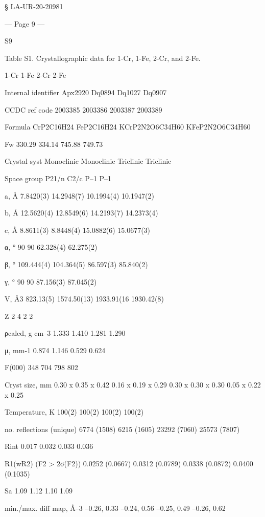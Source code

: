  
 
§ LA-UR-20-20981 


--- Page 9 ---
 
 
S9 
 
 
Table S1. Crystallographic data for 1-Cr, 1-Fe, 2-Cr, and 2-Fe. 
 
1-Cr 
1-Fe 
2-Cr 
2-Fe 
 
Internal identifier 
Apx2920 
Dq0894 
Dq1027 
Dq0907 
 
CCDC ref code 
2003385 
2003386 
2003387 
2003389 
 
Formula 
CrP2C16H24 
FeP2C16H24 
KCrP2N2O6C34H60 
KFeP2N2O6C34H60 
 
Fw 
330.29 
334.14 
745.88 
749.73 
 
Crystal syst 
Monoclinic 
Monoclinic 
Triclinic 
Triclinic 
 
Space group 
P21/n 
C2/c 
P–1 
P–1 
 
a, Å 
7.8420(3) 
14.2948(7) 
10.1994(4) 
10.1947(2) 
 
b, Å 
12.5620(4) 
12.8549(6) 
14.2193(7) 
14.2373(4) 
 
c, Å 
8.8611(3) 
8.8448(4) 
15.0882(6) 
15.0677(3) 
 
α, ° 
90 
90 
62.328(4) 
62.275(2) 
 
β, ° 
109.444(4) 
104.364(5) 
86.597(3) 
85.840(2) 
 
γ, ° 
90 
90 
87.156(3) 
87.045(2) 
 
V, Å3 
823.13(5) 
1574.50(13) 
1933.91(16 
1930.42(8) 
 
Z 
2 
4 
2 
2 
 
ρcalcd, g cm–3 
1.333 
1.410 
1.281 
1.290 
 
μ, mm-1 
0.874 
1.146 
0.529 
0.624 
 
F(000) 
348 
704 
798 
802 
 
Cryst size, mm 
0.30 x 0.35 x 0.42 
0.16 x 0.19 x 0.29 
0.30 x 0.30 x 0.30 
0.05 x 0.22 x 0.25 
 
Temperature, K 
100(2) 
100(2) 
100(2) 
100(2) 
 
no. reflections (unique) 
6774 (1508) 
6215 (1605) 
23292 (7060) 
25573 (7807) 
 
Rint 
0.017 
0.032 
0.033 
0.036 
 
R1(wR2) (F2 > 2σ(F2)) 
0.0252 (0.0667) 
0.0312 (0.0789) 
0.0338 (0.0872) 
0.0400 (0.1035) 
 
Sa 
1.09 
1.12 
1.10 
1.09 
 
min./max. diff map, Å–3 
–0.26, 0.33 
–0.24, 0.56 
–0.25, 0.49 
–0.26, 0.62 
 
